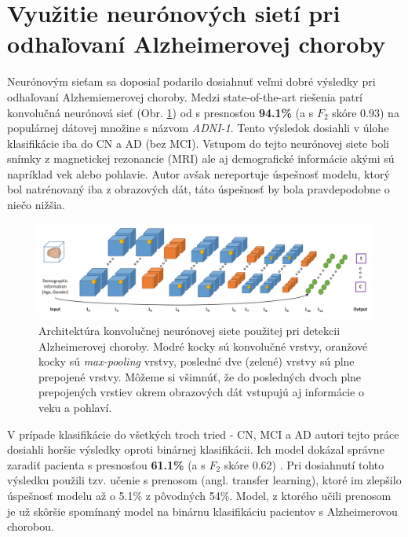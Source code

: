 \section{Využitie neurónových sietí pri odhaľovaní Alzheimerovej choroby \label{sec:nn_ad_prediction}}

Neurónovým sieťam sa doposiaľ podarilo dosiahnuť veľmi dobré výsledky pri odhaľovaní Alzhemiemerovej choroby. Medzi state-of-the-art riešenia patrí konvolučná neurónová sieť (Obr. \ref{fig:ad_cnn_architecture}) od \citeauthor*{esmaeilzadeh2018end} s presnosťou \textbf{94.1\%} (a s $F_2$ skóre 0.93) na populárnej dátovej množine s názvom \textit{ADNI-1}. Tento výsledok dosiahli v úlohe klasifikácie iba do CN a AD (bez MCI). Vstupom do tejto neurónovej siete boli snímky z magnetickej rezonancie (MRI) ale aj demografické informácie akými sú napríklad vek alebo pohlavie. Autor avšak nereportuje úspešnosť modelu, ktorý bol natrénovaný iba z obrazových dát, táto úspešnosť by bola pravdepodobne o niečo nižšia.

\begin{figure}[h!]
    \centering
    \includegraphics[scale=0.35]{assets/images/ad_cnn_architecture.png}
    \caption{Architektúra konvolučnej neurónovej siete použitej pri detekcii Alzheimerovej choroby. \cite{esmaeilzadeh2018end} Modré kocky sú konvolučné vrstvy, oranžové kocky sú \textit{max-pooling} vrstvy, posledné dve (zelené) vrstvy sú plne prepojené vrstvy. Môžeme si všimnúť, že do posledných dvoch plne prepojených vrstiev okrem obrazových dát vstupujú aj informácie o veku a pohlaví.}
    \label{fig:ad_cnn_architecture}
\end{figure}

V prípade klasifikácie do všetkých troch tried - CN, MCI a AD autori tejto práce dosiahli horšie výsledky oproti binárnej klasifikácii. Ich model dokázal správne zaradiť pacienta s presnosťou \textbf{61.1\%} (a s $F_2$ skóre 0.62) \cite{esmaeilzadeh2018end}. Pri dosiahnutí tohto výsledku použili tzv. učenie s prenosom (angl. transfer learning), ktoré im zlepšilo úspešnosť modelu až o 5.1\% z pôvodných 54\%. Model, z ktorého učili prenosom je už skôršie spomínaný model na binárnu klasifikáciu pacientov s Alzheimerovou chorobou.

